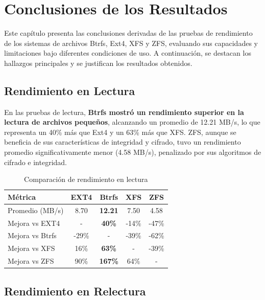 \chapter{Conclusiones de los Resultados}

Este capítulo presenta las conclusiones derivadas de las pruebas de rendimiento de los sistemas de archivos Btrfs, Ext4, XFS y ZFS, evaluando sus capacidades y limitaciones bajo diferentes condiciones de uso. A continuación, se destacan los hallazgos principales y se justifican los resultados obtenidos.

\section{Rendimiento en Lectura}

En las pruebas de lectura, \textbf{Btrfs mostró un rendimiento superior en la lectura de archivos pequeños}, alcanzando un promedio de 12.21 MB/s, lo que representa un 40\% más que Ext4 y un 63\% más que XFS. ZFS, aunque se beneficia de sus características de integridad y cifrado, tuvo un rendimiento promedio significativamente menor (4.58 MB/s), penalizado por sus algoritmos de cifrado e integridad.

\begin{table}[h!]
\centering
\caption{Comparación de rendimiento en lectura}
\begin{tabular}{|l|c|c|c|c|}
\hline
\textbf{Métrica} & \textbf{EXT4} & \textbf{Btrfs} & \textbf{XFS} & \textbf{ZFS} \\ \hline
Promedio (MB/s)   & 8.70          & \textbf{12.21} & 7.50         & 4.58         \\ \hline
Mejora vs EXT4    & -             & \textbf{40\%}  & -14\%        & -47\%        \\ \hline
Mejora vs Btrfs   & -29\%         & -              & -39\%        & -62\%        \\ \hline
Mejora vs XFS     & 16\%          & \textbf{63\%}  & -            & -39\%        \\ \hline
Mejora vs ZFS     & 90\%          & \textbf{167\%} & 64\%         & -            \\ \hline
\end{tabular}
\end{table}

\section{Rendimiento en Relectura}

